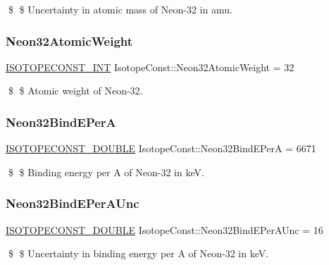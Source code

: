 \$ \$ Uncertainty in atomic mass of Neon-\/32 in amu. \mbox{\label{group___isotope_const-_neon-_ne32_gabaacca718fb7fe14617212452894d793}} 
\subsubsection{\texorpdfstring{Neon32\+Atomic\+Weight}{Neon32AtomicWeight}}
{\footnotesize\ttfamily \mbox{\hyperlink{group___isotope_const-_macros_ga5f18360b3e99483a35c32d789e62621c}{I\+S\+O\+T\+O\+P\+E\+C\+O\+N\+S\+T\+\_\+\+I\+NT}} Isotope\+Const\+::\+Neon32\+Atomic\+Weight = 32}

\$ \$ Atomic weight of Neon-\/32. \mbox{\label{group___isotope_const-_neon-_ne32_ga2535174021e0dd0e4ad55bcebbb61acc}} 
\subsubsection{\texorpdfstring{Neon32\+Bind\+E\+PerA}{Neon32BindEPerA}}
{\footnotesize\ttfamily \mbox{\hyperlink{group___isotope_const-_macros_ga8f45a7272ce02c0b4c65c44636ed719a}{I\+S\+O\+T\+O\+P\+E\+C\+O\+N\+S\+T\+\_\+\+D\+O\+U\+B\+LE}} Isotope\+Const\+::\+Neon32\+Bind\+E\+PerA = 6671}

\$ \$ Binding energy per A of Neon-\/32 in keV. \mbox{\label{group___isotope_const-_neon-_ne32_ga6c5a995e0f6a4ac9befab4cde5b0a26d}} 
\subsubsection{\texorpdfstring{Neon32\+Bind\+E\+Per\+A\+Unc}{Neon32BindEPerAUnc}}
{\footnotesize\ttfamily \mbox{\hyperlink{group___isotope_const-_macros_ga8f45a7272ce02c0b4c65c44636ed719a}{I\+S\+O\+T\+O\+P\+E\+C\+O\+N\+S\+T\+\_\+\+D\+O\+U\+B\+LE}} Isotope\+Const\+::\+Neon32\+Bind\+E\+Per\+A\+Unc = 16}

\$ \$ Uncertainty in binding energy per A of Neon-\/32 in keV. \mbox{\label{group___isotope_const-_neon-_ne32_ga2386a206a2cabdcde4e43b9f85384341}} 
